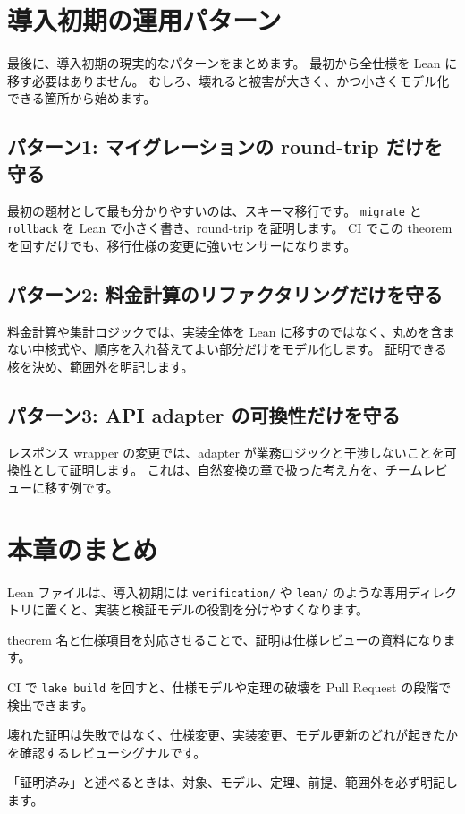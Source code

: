 \section{導入初期の運用パターン}

最後に、導入初期の現実的なパターンをまとめます。
最初から全仕様を Lean に移す必要はありません。
むしろ、壊れると被害が大きく、かつ小さくモデル化できる箇所から始めます。

\subsection{パターン1: マイグレーションの round-trip だけを守る}

最初の題材として最も分かりやすいのは、スキーマ移行です。
\texttt{migrate} と \texttt{rollback} を Lean で小さく書き、round-trip を証明します。
CI でこの theorem を回すだけでも、移行仕様の変更に強いセンサーになります。

\subsection{パターン2: 料金計算のリファクタリングだけを守る}

料金計算や集計ロジックでは、実装全体を Lean に移すのではなく、丸めを含まない中核式や、順序を入れ替えてよい部分だけをモデル化します。
証明できる核を決め、範囲外を明記します。

\subsection{パターン3: API adapter の可換性だけを守る}

レスポンス wrapper の変更では、adapter が業務ロジックと干渉しないことを可換性として証明します。
これは、自然変換の章で扱った考え方を、チームレビューに移す例です。

\section{本章のまとめ}

Lean ファイルは、導入初期には \texttt{verification/} や \texttt{lean/} のような専用ディレクトリに置くと、実装と検証モデルの役割を分けやすくなります。

theorem 名と仕様項目を対応させることで、証明は仕様レビューの資料になります。

CI で \texttt{lake build} を回すと、仕様モデルや定理の破壊を Pull Request の段階で検出できます。

壊れた証明は失敗ではなく、仕様変更、実装変更、モデル更新のどれが起きたかを確認するレビューシグナルです。

「証明済み」と述べるときは、対象、モデル、定理、前提、範囲外を必ず明記します。
